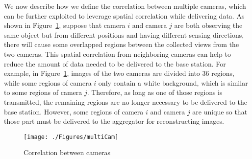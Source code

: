 We now describe how we define the correlation between multiple cameras, which can be further exploited to leverage spatial correlation while delivering data.
As shown in Figure~\ref{fig::multiCam}, suppose that camera $i$ and camera $j$ are both observing the same object but from different positions and having different sensing directions, there will cause some overlapped regions between the collected views from the two cameras.
This spatial correlation from neighboring cameras can help to reduce the amount of data needed to be delivered to the base station.
%
For example, in Figure~\ref{fig::multiCam}, images of the two cameras are divided into $36$ regions, while some regions of camera $i$ only contain a white background, which is similar to some regions of camera $j$.
Therefore, as long as one of those regions is transmitted, the remaining regions are no longer necessary to be delivered to the base station.
However, some regions of camera $i$ and camera $j$ are unique so that those part must be delivered to the aggregator for reconstructing images.
%
\begin{figure}
\begin{center}
\texttt{[image: ./Figures/multiCam]}
\caption{\label{fig::multiCam}Correlation between cameras}
\end{center}
\end{figure}
%